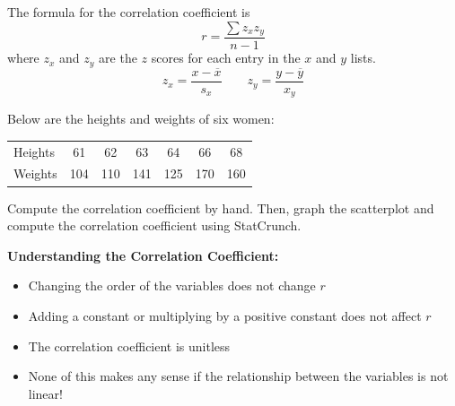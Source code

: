 \documentclass[../mathNotesPreamble]{subfiles}
\begin{document}
  \begin{defn*}
    The formula for the correlation coefficient is
      \[r=\dfrac{\sum z_xz_y}{n-1}\]
    where $z_x$ and $z_y$ are the $z$ scores for each entry in the $x$ and $y$ lists.
      \[z_x=\dfrac{x-\overline{x}}{s_x} \qquad z_y=\dfrac{y-\overline{y}}{x_y}\]
  \end{defn*}
  \begin{ex*}
    Below are the heights and weights of six women:
    \begin{center}
      \begin{tabular}{@{}l*{6}{c}@{}}\toprule
        Heights& 61& 62& 63& 64& 66& 68\\
        Weights& 104& 110& 141& 125& 170& 160\\\bottomrule
      \end{tabular}
    \end{center}
    Compute the correlation coefficient by hand. Then, graph the scatterplot and compute the correlation coefficient using StatCrunch.
  \end{ex*}
  \begin{flushright}
  \end{flushright}
  \pagebreak
  
  \noindent\textbf{Understanding the Correlation Coefficient:}
  \begin{itemize}
    \item Changing the order of the variables does not change $r$
    \item Adding a constant or multiplying by a positive constant does not affect $r$
    \item The correlation coefficient is unitless
    \item None of this makes any sense if the relationship between the variables is not linear!
  \end{itemize}

  \pagebreak
\end{document}
